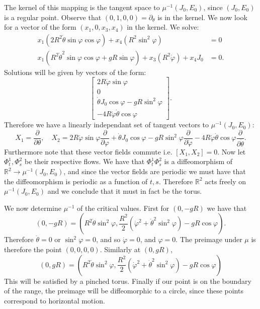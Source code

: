 \documentclass[12pt, a4paper]{article}
\theoremstyle{definition}
\newcommand{\R}{\mathbb{R}}                           %
\newcommand{\bmat}[1]{\begin{bmatrix}#1\end{bmatrix}}
\begin{document}
The kernel of this mapping is the tangent space to $\mu^{-1}(J_0, E_0)$, since $(J_0, E_0)$ is a regular point. Observe that $(0,1,0,0) = \partial_\theta$ is in the kernel. We now look for a vector of the form $(x_1,0,x_3,x_4)$ in the kernel. We solve: 
\begin{align*}
x_1 \left( 2R^2 \dot{\theta} \sin \varphi \cos \varphi \right)+ x_4 \left( R^2 \sin^2 \varphi \right) & = 0
	\\ x_1 \left( R^2 \dot{\theta}^2 \sin \varphi \cos \varphi + gR \sin \varphi \right) + x_3 \left(  R^2 \dot{\varphi} \right) + x_4 J_0 & = 0.
\end{align*}
Solutions will be given by vectors of the form:
$$ \bmat{2 R \dot{\varphi} \sin \varphi \\0 \\  \dot{\theta} J_0 \cos \varphi - gR \sin^2 \varphi \\-4R \dot{\varphi} \dot{\theta} \cos \varphi } .$$
Therefore we have a linearly independant set of tangent vectors to $\mu^{-1}(J_0,E_0)$: $$ X_1 = \frac{\partial }{ \partial \theta },\quad X_2 = 2 R \dot{\varphi} \sin \varphi \frac{ \partial  }{ \partial \varphi }+  \dot{\theta} J_0 \cos \varphi - gR \sin^2 \varphi \frac{ \partial  }{ \partial \dot{\varphi} }  -4R \dot{\varphi} \dot{\theta} \cos \varphi   \frac{ \partial  }{ \partial \dot{\theta} }.$$  
Furthermore note that these vector fields commute i.e. $[X_1,X_2]=0$. Now let $\Phi^1_t, \Phi_s^2$ be their respective flows. We have that $\Phi_t^1 \Phi_s^2$ is a diffeomorphism of $\R^2 \to \mu^{-1}(J_0,E_0)$, and since the vector fields are periodic we must have that the diffeomorphism is periodic as a function of $t,s$. Therefore $\R^2$ acts freely on $\mu^{-1}(J_0,E_0)$ and we conclude that it must in fact be the torus. 
\item We now determine $\mu^{-1}$ of the critical values. First for $ \left(0 , -gR \right) $ we have that 
$$ \left( 0,-gR  \right) =  \left( R^2 \dot{\theta} \sin^2 \varphi , \frac{ R^2 }{ 2 } \left( \dot{\varphi}^2  + \dot{\theta}^2 \sin^2 \varphi \right)  - gR \cos \varphi\right) .  $$ 
Therefore $\dot{\theta}= 0$ or $\sin^2\varphi = 0$, and so $\dot{\varphi} = 0$, and  $\varphi =  0 $. The preimage under $\mu$ is therefore the point  $ \left( 0, 0 ,0,0 \right) $. 
Similarly at $ \left( 0, gR \right)$, 
$$ \left( 0, gR \right) =  \left( R^2 \dot{\theta} \sin^2 \varphi , \frac{ R^2 }{ 2 } \left( \dot{\varphi}^2  + \dot{\theta}^2 \sin^2 \varphi \right)  - gR \cos \varphi\right)  $$ 
This will be satisfied by a pinched torus. 
Finally if our point is on the boundary of the range, the preimage will be diffeomorphic to a circle, since these points correspond to horizontal motion. 
\end{document}
